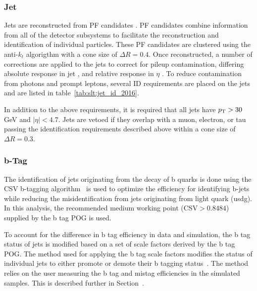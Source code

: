 \subsubsection{Jet}
Jets are reconstructed from PF candidates \cite{ref:pf}. PF candidates combine information from all of the detector subsystems to facilitate the reconstruction and identification of individual particles.  These PF candidates are clustered using the anti-$k_{t}$ algorigthm \cite{Cacciari:2008gp} with a cone size of $\Delta R = 0.4$. Once reconstructed, a number of corrections are applied to the jets to correct for pileup contamination, differing absolute response in jet \pt, and relative response in $\eta$ \cite{ref:jetscale}.  To reduce contamination from photons and prompt leptons, several ID requirements are placed on the jets and are listed in table~\ref{tab:slt:jet_id_2016}.



\noindent In addition to the above requirements, it is required that all jets have $p_{\mathrm{T}} > 30$ GeV and $\left|\eta\right| < 4.7$.  Jets are vetoed if they overlap with a muon, electron, or tau passing the identification requirements described above within a cone size of $\Delta R = 0.3$. 

\subsubsection{b-Tag} The identification of jets originating from the decay of b quarks is done using the CSV b-tagging algorithm~\cite{Sirunyan:2298594} is used to optimize the efficiency for identifying b-jets while reducing the misidentification from jets originating from light quark (usdg).  In this analysis, the recommended medium working point ($\text{CSV} > 0.8484$) supplied by the b tag POG is used.  

To account for the difference in b tag efficiency in data and simulation, the b tag status of jets is modified based on a set of scale factors derived by the b tag POG.  The method used for applying the b tag scale factors modifies the status of individual jets to either promote or demote their b tagging status~\cite{twiki:btag_method}.  The method relies on the user measuring the b tag and mistag efficiencies in the simulated samples.  This is described further in Section~\label{sec:app:btag}.


\FloatBarrier

